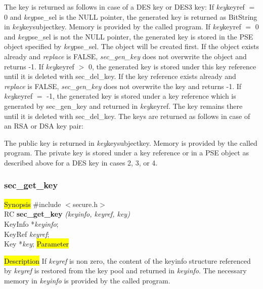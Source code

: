 The key is returned as follows in case of a DES key or DES3 key:
\be
\m If {\em key}\pf keyref $=$ 0 and {\em key}\pf pse\_sel is the NULL pointer, the generated key is
   returned as BitString in {\em key}\pf key\pf subjectkey. Memory is provided by the called program. 
\m If {\em key}\pf keyref $=$ 0 and {\em key}\pf pse\_sel is not the NULL pointer, the generated key
   is stored in the PSE object specified by {\em key}\pf pse\_sel.
   The object will be created first. If the object exists already and {\em replace} is FALSE, 
   {\em sec\_gen\_key} does not overwrite the object and returns -1.
\m If {\em key}\pf keyref $>$ 0, the generated key is stored under this key reference until it is
   deleted with sec\_del\_key.
   If the key reference exists already and {\em replace} is FALSE, {\em sec\_gen\_key}
   does not overwrite the key and returns -1.
\m If {\em key}\pf keyref $=$ -1, the generated key is stored under a key reference which is generated 
   by sec\_gen\_key and returned in {\em key}\pf keyref. The key remains there until it is deleted
   with sec\_del\_key.
\ee
The keys are returned as follows in case of an RSA or DSA key pair: 

The public key is returned in {\em key}\pf key\pf subjectkey. Memory is provided by the called program.
The private key is stored under a key reference or in a PSE object as described above for a DES key in 
cases 2, 3, or 4.

\subsubsection{sec\_get\_key}
\label{sec_get_key}
\hl{Synopsis}
\#include $<$secure.h$>$ \\ [0.5cm]
RC {\bf sec\_get\_key} {\em (keyinfo, keyref, key)} \\
KeyInfo *{\em keyinfo}; \\
KeyRef {\em keyref}; \\
Key *{\em key};
\hl{Parameter}



\hl{Description}
If {\em keyref} is non zero, the content of the keyinfo structure referenced 
by {\em keyref} is restored from the key pool and returned 
in {\em keyinfo}. The necessary memory in {\em keyinfo} is provided
by the called program. 

